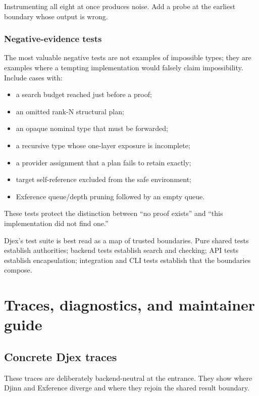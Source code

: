 \documentclass[10pt,letterpaper,oneside]{report}
\begin{document}
Instrumenting all eight at once produces noise. Add a probe at the earliest boundary whose output is wrong.

\section{Negative-evidence tests}

The most valuable negative tests are not examples of impossible types; they are examples where a tempting implementation would falsely claim impossibility. Include cases with:

\begin{itemize}
  \item a search budget reached just before a proof;
  \item an omitted rank-N structural plan;
  \item an opaque nominal type that must be forwarded;
  \item a recursive type whose one-layer exposure is incomplete;
  \item a provider assignment that a plan fails to retain exactly;
  \item target self-reference excluded from the safe environment;
  \item Exference queue/depth pruning followed by an empty queue.
\end{itemize}

These tests protect the distinction between ``no proof exists'' and ``this implementation did not find one.''

\begin{summarybox}
Djex's test suite is best read as a map of trusted boundaries. Pure shared tests establish authorities; backend tests establish search and checking; API tests establish encapsulation; integration and CLI tests establish that the boundaries compose.
\end{summarybox}


\part{Traces, diagnostics, and maintainer guide}

\chapter{Concrete Djex traces}\label{ch:djex-traces}

These traces are deliberately backend-neutral at the entrance. They show where Djinn and Exference diverge and where they rejoin the shared result boundary.
\end{document}
